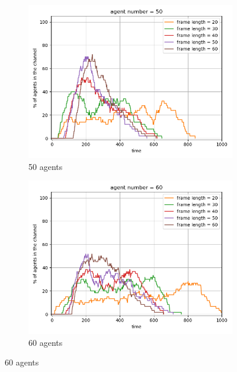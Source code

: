 {\begin{figure}[htb]
    \vspace{1cm}
    
    \begin{subfigure}[t]{0.45\linewidth}
        \centering
        \includegraphics[width=\linewidth]{figures/channel_usage_agent50.png}
        \caption{50 agents}
        \label{fig:agentpercent5}
    \end{subfigure}
    \hfill
    \begin{subfigure}[t]{0.45\linewidth}
        \centering
        \includegraphics[width=\linewidth]{figures/channel_usage_agent60.png}
        \caption{60 agents}
        \label{fig:agentpercent6}
    \end{subfigure}
    

\end{figure}}
